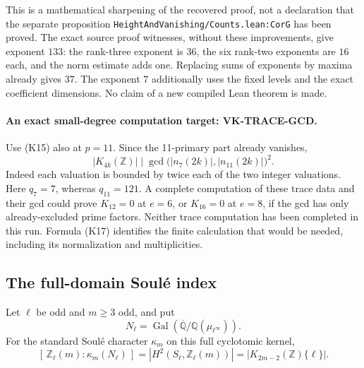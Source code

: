 This is a mathematical sharpening of the recovered proof,
not a declaration that the separate proposition
\texttt{HeightAndVanishing/Counts.lean:CorG} has been proved.
The exact source proof witnesses, without these improvements,
give exponent \(133\): the rank-three exponent is \(36\),
the six rank-two exponents are \(16\) each, and the norm
estimate adds one. Replacing sums of exponents by maxima
already gives \(37\). The exponent \(7\) additionally uses
the fixed levels and the exact coefficient dimensions.
No claim of a new compiled Lean theorem is made.

\paragraph{An exact small-degree computation target: VK-TRACE-GCD.}
Use (K15) also at \(p=11\). Since the 11-primary part
already vanishes,
\[
 |K_{4k}(\mathbb Z)|
 \mid \gcd\bigl(|n_7(2k)|,|n_{11}(2k)|\bigr)^2.       \tag{K17}
\]
Indeed each valuation is bounded by twice each of the two
integer valuations. Here \(q_7=7\), whereas \(q_{11}=121\).
A complete computation of these trace data and their gcd
could prove \(K_{12}=0\) at \(e=6\), or \(K_{16}=0\)
at \(e=8\), if the gcd has only already-excluded prime factors.
Neither trace computation has been completed in this run.
Formula (K17) identifies the finite calculation that would
be needed, including its normalization and multiplicities.

\subsection{The full-domain Soul\'e index}

\begin{theorem}
Let \(\ell\) be odd and \(m\ge3\) odd, and put
\[
 N_\ell=\operatorname{Gal}
   (\overline{\mathbb Q}/\mathbb Q(\mu_{\ell^\infty})).
\]
For the standard Soul\'e character \(\kappa_m\) on this
full cyclotomic kernel,
\[
 [\,\mathbb Z_\ell(m):\kappa_m(N_\ell)\,]
   =|H^2(S_\ell,\mathbb Z_\ell(m))|
   =|K_{2m-2}(\mathbb Z)\{\ell\}|.                   \tag{K18}
\]
\end{theorem}

